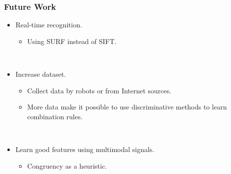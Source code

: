 \documentclass[t]{beamer}
\begin{document}
\begin{frame}
  \frametitle{Future Work}

  \begin{itemize}
    \item Real-time recognition.
      \begin{itemize}
        \item Using SURF instead of SIFT.
      \end{itemize}

      ~
    \item Increase dataset.
      \begin{itemize}
        \item Collect data by robots or from Internet sources.
        \item More data make it possible to use discriminative methods to learn combination rules.
      \end{itemize}

      ~
    \item Learn good features using multimodal signals.
      \begin{itemize}
        \item Congruency as a heuristic.
      \end{itemize}
  \end{itemize}
\end{frame}
\end{document}
